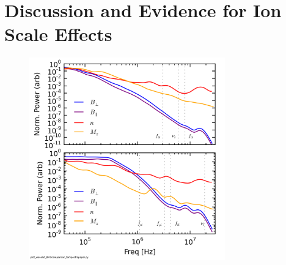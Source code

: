 \documentclass[aip,prl,amsmath,amssymb,reprint,superscriptaddress]{revtex4-1} %
\begin{document}
\section{Discussion and Evidence for Ion Scale Effects}

\begin{figure}[!htbp]
\centerline{
\includegraphics[width=8.5cm]{BvsDensvsFlowspec_1mWb_and_0mWbcomp_40t60us}}
\caption{\label{fig:BMD_comp}}
\end{figure}




\end{document}
